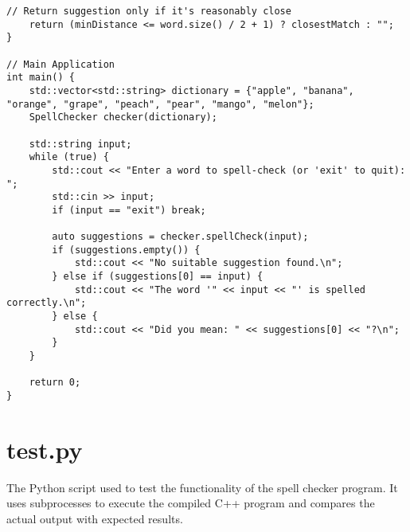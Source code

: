 \documentclass{article}
\begin{document}
\begin{lstlisting}[caption={main.cpp}, label={lst:main}]
    // Return suggestion only if it's reasonably close
    return (minDistance <= word.size() / 2 + 1) ? closestMatch : "";
}

// Main Application
int main() {
    std::vector<std::string> dictionary = {"apple", "banana", "orange", "grape", "peach", "pear", "mango", "melon"};
    SpellChecker checker(dictionary);

    std::string input;
    while (true) {
        std::cout << "Enter a word to spell-check (or 'exit' to quit): ";
        std::cin >> input;
        if (input == "exit") break;

        auto suggestions = checker.spellCheck(input);
        if (suggestions.empty()) {
            std::cout << "No suitable suggestion found.\n";
        } else if (suggestions[0] == input) {
            std::cout << "The word '" << input << "' is spelled correctly.\n";
        } else {
            std::cout << "Did you mean: " << suggestions[0] << "?\n";
        }
    }

    return 0;
}
\end{lstlisting}

\section*{test.py}
The Python script used to test the functionality of the spell checker program. It uses subprocesses to execute the compiled C++ program and compares the actual output with expected results.
\end{document}
